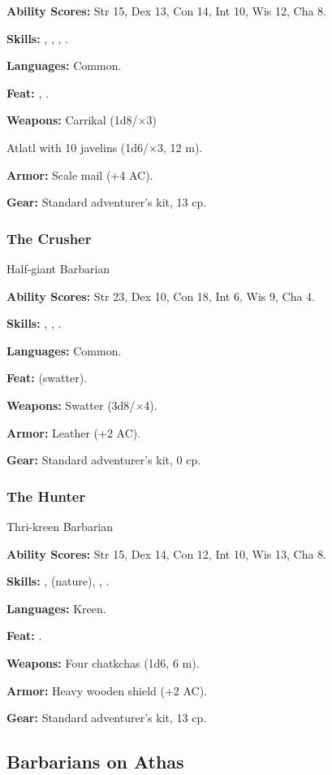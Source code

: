 \textbf{Ability Scores:} Str 15, Dex 13, Con 14, Int 10, Wis 12, Cha 8.

\textbf{Skills:} , , , .

\textbf{Languages:} Common.

\textbf{Feat:} , .

\textbf{Weapons:} Carrikal (1d8/$\times$3)

Atlatl with 10 javelins (1d6/$\times$3, 12 m).

\textbf{Armor:} Scale mail (+4 AC).

\textbf{Gear:} Standard adventurer's kit, 13 cp.

\subsubsection{The Crusher}
Half-giant Barbarian

\textbf{Ability Scores:} Str 23, Dex 10, Con 18, Int 6, Wis 9, Cha 4.

\textbf{Skills:} , , .

\textbf{Languages:} Common.

\textbf{Feat:}  (swatter).

\textbf{Weapons:} Swatter (3d8/$\times$4).

\textbf{Armor:} Leather (+2 AC).

\textbf{Gear:} Standard adventurer's kit, 0 cp.

\subsubsection{The Hunter}
Thri-kreen Barbarian

\textbf{Ability Scores:} Str 15, Dex 14, Con 12, Int 10, Wis 13, Cha 8.

\textbf{Skills:} ,  (nature), , .

\textbf{Languages:} Kreen.

\textbf{Feat:} .

\textbf{Weapons:} Four chatkchas (1d6, 6 m).

\textbf{Armor:} Heavy wooden shield (+2 AC).

\textbf{Gear:} Standard adventurer's kit, 13 cp.


\subsection{Barbarians on Athas}

